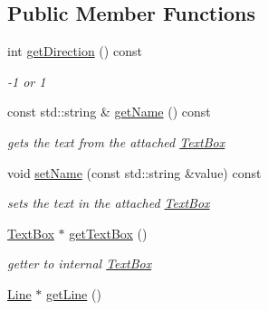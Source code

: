 \subsection*{Public Member Functions}
\begin{DoxyCompactItemize}
\item 
int \hyperlink{classcanvascv_1_1LineCrossing_adfd51e0d8d224200b4466627241df4c9}{get\+Direction} () const \hypertarget{classcanvascv_1_1LineCrossing_adfd51e0d8d224200b4466627241df4c9}{}\label{classcanvascv_1_1LineCrossing_adfd51e0d8d224200b4466627241df4c9}

\begin{DoxyCompactList}\small\item\em -\/1 or 1 \end{DoxyCompactList}\item 
const std\+::string \& \hyperlink{classcanvascv_1_1LineCrossing_a3a2bdd022bca8469ebdc63572fe86f06}{get\+Name} () const \hypertarget{classcanvascv_1_1LineCrossing_a3a2bdd022bca8469ebdc63572fe86f06}{}\label{classcanvascv_1_1LineCrossing_a3a2bdd022bca8469ebdc63572fe86f06}

\begin{DoxyCompactList}\small\item\em gets the text from the attached \hyperlink{classcanvascv_1_1TextBox}{Text\+Box} \end{DoxyCompactList}\item 
void \hyperlink{classcanvascv_1_1LineCrossing_a577a282941ac95558da70bdcad0623ee}{set\+Name} (const std\+::string \&value) const \hypertarget{classcanvascv_1_1LineCrossing_a577a282941ac95558da70bdcad0623ee}{}\label{classcanvascv_1_1LineCrossing_a577a282941ac95558da70bdcad0623ee}

\begin{DoxyCompactList}\small\item\em sets the text in the attached \hyperlink{classcanvascv_1_1TextBox}{Text\+Box} \end{DoxyCompactList}\item 
\hyperlink{classcanvascv_1_1TextBox}{Text\+Box} $\ast$ \hyperlink{classcanvascv_1_1LineCrossing_a186d5a3556954ff2b50e21ba8c675792}{get\+Text\+Box} ()\hypertarget{classcanvascv_1_1LineCrossing_a186d5a3556954ff2b50e21ba8c675792}{}\label{classcanvascv_1_1LineCrossing_a186d5a3556954ff2b50e21ba8c675792}

\begin{DoxyCompactList}\small\item\em getter to internal \hyperlink{classcanvascv_1_1TextBox}{Text\+Box} \end{DoxyCompactList}\item 
\hyperlink{classcanvascv_1_1Line}{Line} $\ast$ \hyperlink{classcanvascv_1_1LineCrossing_a9ee35848f19c6841cc59a373726ba8dc}{get\+Line} ()\hypertarget{classcanvascv_1_1LineCrossing_a9ee35848f19c6841cc59a373726ba8dc}{}\label{classcanvascv_1_1LineCrossing_a9ee35848f19c6841cc59a373726ba8dc}


\end{DoxyCompactItemize}
